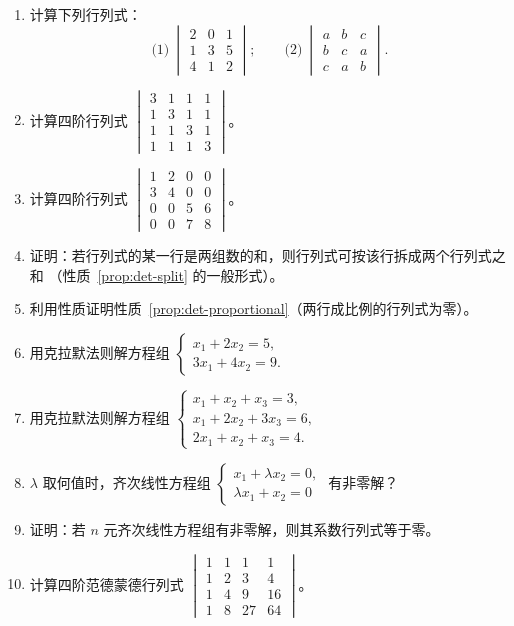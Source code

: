 \begin{enumerate}[label=\arabic*., itemsep=2pt]
\item 计算下列行列式：
  \[
  \text{(1)}\ \begin{vmatrix} 2 & 0 & 1 \\ 1 & 3 & 5 \\ 4 & 1 & 2 \end{vmatrix};
  \qquad
  \text{(2)}\ \begin{vmatrix} a & b & c \\ b & c & a \\ c & a & b \end{vmatrix}.
  \]
\item 计算四阶行列式
  $\begin{vmatrix} 3 & 1 & 1 & 1 \\ 1 & 3 & 1 & 1 \\ 1 & 1 & 3 & 1 \\ 1 & 1 & 1 & 3 \end{vmatrix}$。
\item 计算四阶行列式
  $\begin{vmatrix} 1 & 2 & 0 & 0 \\ 3 & 4 & 0 & 0 \\ 0 & 0 & 5 & 6 \\ 0 & 0 & 7 & 8 \end{vmatrix}$。
\item 证明：若行列式的某一行是两组数的和，则行列式可按该行拆成两个行列式之和
  （性质~\ref{prop:det-split} 的一般形式）。
\item 利用性质证明性质~\ref{prop:det-proportional}（两行成比例的行列式为零）。
\item 用克拉默法则解方程组
  $\begin{cases} x_1+2x_2=5, \\ 3x_1+4x_2=9. \end{cases}$
\item 用克拉默法则解方程组
  $\begin{cases} x_1+x_2+x_3=3, \\ x_1+2x_2+3x_3=6, \\ 2x_1+x_2+x_3=4. \end{cases}$
\item $\lambda$ 取何值时，齐次线性方程组
  $\begin{cases} x_1+\lambda x_2=0, \\ \lambda x_1+x_2=0 \end{cases}$
  有非零解？
\item 证明：若 $n$ 元齐次线性方程组有非零解，则其系数行列式等于零。
\item 计算四阶范德蒙德行列式
  $\begin{vmatrix} 1 & 1 & 1 & 1 \\ 1 & 2 & 3 & 4 \\ 1 & 4 & 9 & 16 \\ 1 & 8 & 27 & 64 \end{vmatrix}$。
\end{enumerate}
